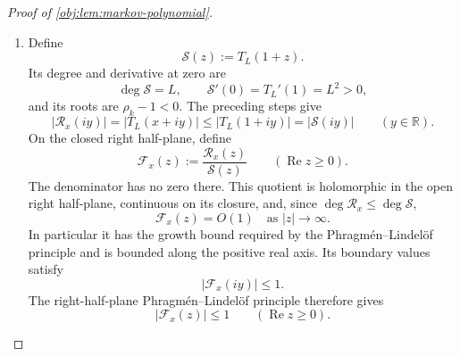 \begin{proof}[Proof of \cref{obj:lem:markov-polynomial}]
\begin{enumerate}
For the fixed \(x\), define
\[
\theta_x:=\arccos x,\qquad
\delta_{\mathrm{ang}}:=\frac{\pi}{2L}.
\]
Choose \(k_{\mathrm{shift}}\in\mathbb Z\) nearest to \(L\theta_x/\pi\), and put
\[
\phi_x:=\theta_x-\frac{k_{\mathrm{shift}}\pi}{L},
\qquad
|\phi_x|\le\delta_{\mathrm{ang}}.
\]
The two lists \(\mathscr D_L(\theta_x)\) and
\(\mathscr D_L(\phi_x)\) have the same multiset of entries: their angles run through the odd multiples of \(\pi/(2L)\), shifted by the respective angle, and adding an integer multiple of \(\pi/L\) permutes these angles modulo \(2\pi\).

Define
\[
q_{k,+}:=d_{\mathrm{ch}}(\alpha_k+|\phi_x|),
\qquad
q_{k,-}:=d_{\mathrm{ch}}(\alpha_k-|\phi_x|)
\quad(0\le k<L).
\]
All the arguments lie in \([0,\pi]\). Since \(d_{\mathrm{ch}}\) increases on this interval and consecutive root angles differ by \(2\delta_{\mathrm{ang}}\),
\[
q_{k,-}\le q_{k,+},
\qquad
q_{k,+}\le q_{k+1,-}\quad(0\le k<L-1).
\]
Hence reversing the root blocks and placing \(q_{k,+}\) before \(q_{k,-}\) gives a decreasing list. Replacing \(\phi_x\) by \(|\phi_x|\) merely exchanges the two entries within a block, and reversing blocks preserves their paired product. The sorting inequality therefore implies
\[
\mathcal P_{4y^2}\bigl(\mathscr D_L(\theta_x)\bigr)
\le
\mathcal P_{4y^2}\bigl(\mathscr D_L(\phi_x)\bigr).
\]
The elementary chord identity
\[
d_{\mathrm{ch}}(\theta+\alpha_k)
d_{\mathrm{ch}}(\theta-\alpha_k)
=4(\cos\theta-\rho_k)^2
\]
turns this into
\[
4^L\left(\prod_{k=0}^{L-1}|x-\rho_k+iy|\right)^2
\le
4^L\left(\prod_{k=0}^{L-1}|\cos\phi_x-\rho_k+iy|\right)^2.
\]
The products are nonnegative, so
\[
\prod_{k=0}^{L-1}|x-\rho_k+iy|
\le
\prod_{k=0}^{L-1}|\cos\phi_x-\rho_k+iy|.
\]
Also
\[
\rho_k\le\cos\delta_{\mathrm{ang}}
\le\cos\phi_x\le1.
\]
Thus each factor on the right is bounded by its endpoint counterpart:
\[
|\cos\phi_x-\rho_k+iy|^2
=(\cos\phi_x-\rho_k)^2+y^2
\le(1-\rho_k)^2+y^2
=|1-\rho_k+iy|^2.
\]
Multiplying these bounds and then multiplying by \(2^{L-1}\) proves the required vertical comparison.

\item Define
\[
\mathcal S(z):=T_L(1+z).
\]
Its degree and derivative at zero are
\[
\deg\mathcal S=L,\qquad \mathcal S'(0)=T_L'(1)=L^2>0,
\]
and its roots are \(\rho_k-1<0\). The preceding steps give
\[
|\mathcal R_x(iy)|=|T_L(x+iy)|
\le|T_L(1+iy)|=|\mathcal S(iy)|
\qquad(y\in\mathbb R).
\]
On the closed right half-plane, define
\[
\mathcal F_x(z):=\frac{\mathcal R_x(z)}{\mathcal S(z)}
\qquad(\operatorname{Re}z\ge0).
\]
The denominator has no zero there. This quotient is holomorphic in the open right half-plane, continuous on its closure, and, since
\(\deg\mathcal R_x\le\deg\mathcal S\),
\[
\mathcal F_x(z)=O(1)\quad\text{as }|z|\to\infty.
\]
In particular it has the growth bound required by the
Phragm\'en--Lindel\"of principle and is bounded along the positive real axis.
Its boundary values satisfy
\[
|\mathcal F_x(iy)|\le1.
\]
The right-half-plane Phragm\'en--Lindel\"of principle therefore gives
\[
|\mathcal F_x(z)|\le1
\qquad(\operatorname{Re}z\ge0).
\]


\end{enumerate}
\end{proof}
